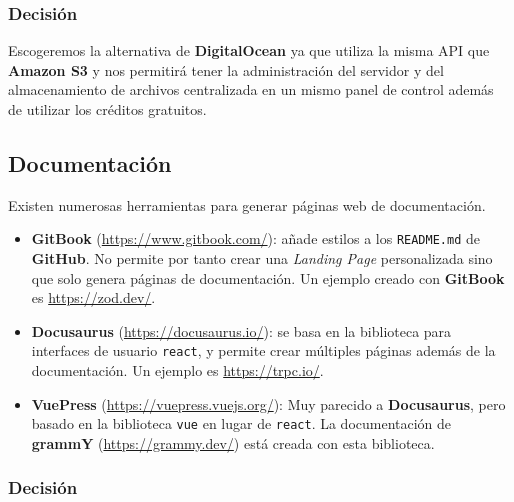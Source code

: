 \subsubsection{Decisión}

Escogeremos la alternativa de \textbf{DigitalOcean} ya que utiliza la misma API que \textbf{Amazon S3} y nos permitirá tener la administración del servidor y del almacenamiento de archivos centralizada en un mismo panel de control además de utilizar los créditos gratuitos.


\subsection{Documentación}\label{subsection:decisionDocumentacion}

Existen numerosas herramientas para generar páginas web de documentación.

\begin{itemize}
    \item \textbf{GitBook} (\url{https://www.gitbook.com/}): añade estilos a los \texttt{README.md} de \textbf{GitHub}. No permite por tanto crear una \textit{Landing Page} personalizada sino que solo genera páginas de documentación. Un ejemplo creado con \textbf{GitBook} es \url{https://zod.dev/}.
    \item \textbf{Docusaurus} (\url{https://docusaurus.io/}): se basa en la biblioteca para interfaces de usuario \texttt{react}, y permite crear múltiples páginas además de la documentación. Un ejemplo es \url{https://trpc.io/}.
    \item \textbf{VuePress} (\url{https://vuepress.vuejs.org/}): Muy parecido a \textbf{Docusaurus}, pero basado en la biblioteca \texttt{vue} en lugar de \texttt{react}. La documentación de \textbf{grammY} (\url{https://grammy.dev/}) está creada con esta biblioteca.
\end{itemize}

\subsubsection{Decisión}

